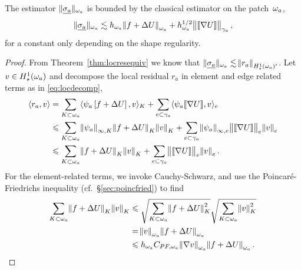 \documentclass[thesis.tex]{subfiles}
\begin{document}
  \begin{lem}
    \label{lem:clas123}
  The estimator $\| \underline{\sigma_a} \|_{\omega_a}$ is bounded by the classical estimator on the patch~$\omega_a$, 
  \[
    \| \underline{\sigma_a} \|_{\omega_a} \lesssim h_{\omega_a}\norm{f + \Delta U}_{\omega_a} + h^{1/2}_{\omega_a} \norm{\llbracket \nabla U  \rrbracket}_{\gamma_a},
  \]
  for a constant only depending on the shape regularity.
  \end{lem}
  \begin{proof}
  From Theorem~\ref{thm:locresequiv} we know that $\| \underline{\sigma_a} \|_{\omega_a} \lesssim \norm{r_a}_{H_\star^1(\omega_a)'}$.
  Let $v \in H_\star^1(\omega_a)$ and decompose the local residual $r_a$ in element and edge related terms as in \eqref{eq:locdecomp},
  \begin{equation}
    \label{eq:locresupper}
  \begin{aligned}
    \langle r_a, v \rangle &= \sum_{K \subset \omega_a} \langle \psi_a\left[f + \Delta U\right], v \rangle_{K} + \sum_{e \subset \gamma_a} \langle \psi_a \llbracket \nabla U \rrbracket, v \rangle_e\\
    &\leqslant \sum_{K \subset \omega_a} \norm{\psi_a}_{\infty,K} \norm{f + \Delta U}_{K}\norm{v}_{K} + \sum_{e \subset \gamma_a} \norm{\psi_a}_{\infty, e} \norm{ \llbracket \nabla U \rrbracket}_e \norm{v}_e\\
    &\leqslant \sum_{K \subset \omega_a} \norm{f + \Delta U}_{K}\norm{v}_{K} + \sum_{e \subset \gamma_a} \norm{ \llbracket \nabla U \rrbracket}_e \norm{v}_e.
  \end{aligned}
\end{equation}
  For the element-related terms, we invoke Cauchy-Schwarz, and use the
  Poincar\'e-Friedrichs inequality (cf.~\S\ref{sec:poincfried}) to find
  \begin{align*}
    \sum_{K \subset \omega_a} \norm{f + \Delta U}_{K} \norm{v}_K &\leqslant \sqrt{\sum_{K \subset \omega_a} \norm{f + \Delta U}^2_K}\sqrt{\sum_{K \subset \omega_a} \norm{v}^2_K} \\
    &= \norm{v}_{\omega_a} \norm{f + \Delta U}_{\omega_a} \\
    &\leqslant h_{\omega_a} C_{PF,\omega_a} \norm{\nabla v}_{\omega_a} \norm{f + \Delta U}_{\omega_a}.
  \end{align*}


\end{proof}
\end{document}
